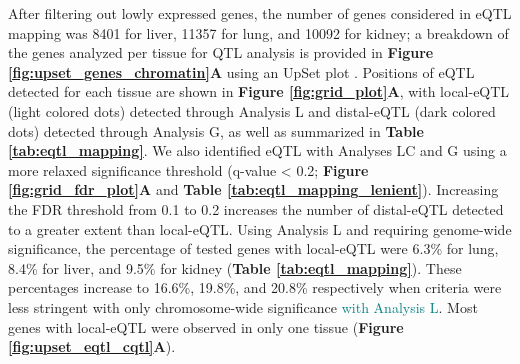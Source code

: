 \documentclass[9pt,twocolumn,twoside]{gsajnl}
\newcommand{\GKinline}[1]{\textcolor{teal}{#1}}
\begin{document}
After filtering out lowly expressed genes, the number of genes considered in eQTL mapping was 8401 for liver, 11357 for lung, and 10092 for kidney; a breakdown of the genes analyzed per tissue for QTL analysis is provided in \textbf{Figure \ref{fig:upset_genes_chromatin}A} using an UpSet plot \citep{Conway2017}. 
Positions of eQTL detected for each tissue are shown in \textbf{Figure \ref{fig:grid_plot}A}, with local-eQTL (light colored dots) detected through Analysis L and distal-eQTL (dark colored dots) detected through Analysis G, as well as summarized in \textbf{Table \ref{tab:eqtl_mapping}}. 
We also identified eQTL with Analyses LC and G using a more relaxed significance threshold (q-value < 0.2; \textbf{Figure \ref{fig:grid_fdr_plot}A} and \textbf{Table \ref{tab:eqtl_mapping_lenient}}). Increasing the FDR threshold from 0.1 to 0.2 increases the number of distal-eQTL detected to a greater extent than local-eQTL. Using Analysis L and requiring genome-wide significance, the percentage of tested genes with local-eQTL were 6.3\% for lung, 8.4\% for liver, and 9.5\% for kidney (\textbf{Table \ref{tab:eqtl_mapping}}). These percentages increase to 16.6\%, 19.8\%, and 20.8\% respectively when criteria were less stringent with only chromosome-wide significance \GKinline{with Analysis L}. Most genes with local-eQTL were observed in only one tissue (\textbf{Figure \ref{fig:upset_eqtl_cqtl}A}).
\end{document}
